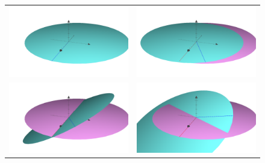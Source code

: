 \documentclass[11pt,a4paper,oneside,onecolumn]{jreport}
\begin{document}
\begin{figure}[H]
\begin{tabular}{cc}
\begin{minipage}[t]{0.45\hsize}
\centering
\includegraphics[width=7cm]{./image/ellipse1.pdf}
\end{minipage} &
\begin{minipage}[t]{0.45\hsize}
\centering
\includegraphics[width=7cm]{./image/ellipse2.pdf}
\end{minipage}\\
%
\begin{minipage}[t]{0.45\hsize}
\centering
\includegraphics[width=7cm]{./image/ellipse3.pdf}
\end{minipage} &
\begin{minipage}[t]{0.45\hsize}
\centering
\includegraphics[width=7cm]{./image/ellipse4.pdf}
\end{minipage}
%
\end{tabular}
\caption{\label{fig:grapher}}
\end{figure}
\end{document}
